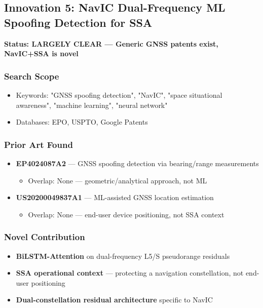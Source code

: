\documentclass[11pt,a4paper]{article}
\begin{document}
\newpage

\subsection{Innovation 5: NavIC Dual-Frequency ML Spoofing Detection for SSA}

\textbf{Status: \textcolor{attgreen}{LARGELY CLEAR — Generic GNSS patents exist, NavIC+SSA is novel}}

\subsubsection*{Search Scope}
\begin{itemize}
\item Keywords: "GNSS spoofing detection", "NavIC", "space situational awareness", "machine learning", "neural network"
\item Databases: EPO, USPTO, Google Patents
\end{itemize}

\subsubsection*{Prior Art Found}
\begin{itemize}
\item \textbf{EP4024087A2} — GNSS spoofing detection via bearing/range measurements
  \begin{itemize}
  \item Overlap: None — geometric/analytical approach, not ML
  \end{itemize}
\item \textbf{US20200049837A1} — ML-assisted GNSS location estimation
  \begin{itemize}
  \item Overlap: None — end-user device positioning, not SSA context
  \end{itemize}
\end{itemize}

\subsubsection*{Novel Contribution}
\begin{itemize}
\item \textbf{BiLSTM-Attention} on dual-frequency L5/S pseudorange residuals
\item \textbf{SSA operational context} — protecting a navigation constellation, not end-user positioning
\item \textbf{Dual-constellation residual architecture} specific to NavIC
\end{itemize}
\end{document}
